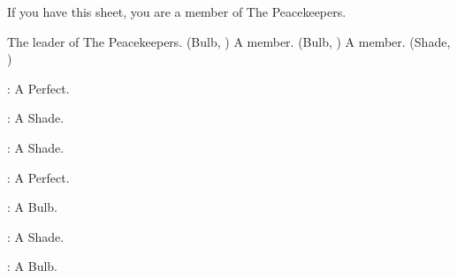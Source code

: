 \documentclass[blue]{Silversiders}
\begin{document}
\name{\bPeacekeepers{}}

If you have this sheet, you are a member of The Peacekeepers.

\begin{members}
	\member{\cCaregiver{}} The leader of The Peacekeepers. (Bulb, \cCaregiver{\Sex})
	\member{\cBeauty{}} A member. (Bulb, \cBeauty{\Sex})
	\member{\cTraitor{}} A member. (Shade, \cTraitor{\Sex})
	
\end{members}

\begin{itemz}
	\item \cTruth{}: A \cTruth{\sex} Perfect.
	\item \cWisdom{}: A \cWisdom{\sex} Shade.
	\item \cLove{}: A \cLove{\sex} Shade.
	\item \cFamine{}: A \cFamine{\sex} Perfect.
	\item \cOutcast{}: A \cOutcast{\sex} Bulb.
	\item \cIngenuity{}: A \cIngenuity{\sex} Shade.
	\item \cHonor{}: A \cHonor{\sex} Bulb.

\end{itemz}
\end{document}
